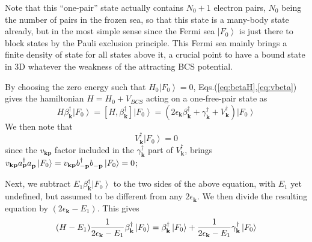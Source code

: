 \documentclass[epj]{svjour}
\newcommand{\vk}{\ensuremath{\mathbf{k}}}
\begin{document}
 Note that this ``one-pair'' state actually contains $N_0+1$ electron pairs, 
$N_0$ being the number of pairs in the frozen sea, so that this state is a many-body state already, but in the most simple sense since the Fermi sea $%
\left|F_0\right> $ is just there to block states by the Pauli exclusion
principle. This Fermi sea mainly brings a finite density of state for all
states above it, a crucial point to have a bound state in 3D whatever the weakness of the attracting BCS potential.

By choosing the zero energy such
that $H_0\left|F_0\right> =0$, Eqs.(\ref{eq:betaH},\ref{eq:vbeta}) gives the hamiltonian $H=H_0+V_{BCS}$
acting on a one-free-pair state as 
\begin{equation}
H\beta^{\dagger}_\vk\left|F_0\right>  =\left[H,\beta^{\dagger}_\vk\right] 
\left|F_0\right> 
=\left(2\epsilon_\vk\beta^{\dagger}_\vk+\gamma^{\dagger}_\vk+V^{\dagger}_\vk%
\right) \left|F_0\right>  
\end{equation}
We then note that 
\begin{equation}\label{eq:Vk0}
V^{\dagger}_\vk\left|F_0\right> =0
\end{equation}
since the $v_{\mathbf{k} \mathbf{p} }$ factor included
in the $\gamma^{\dagger}_{\mathbf{k} }$ part of $V^{\dagger}_\vk$,  brings
 $v_{\mathbf{k} \mathbf{p} }a^{\dagger}_{\mathbf{p} }a^{}_{%
\mathbf{p} }\left|F_0\right>=v_{\mathbf{k} \mathbf{p} }b^{\dagger}_{-\mathbf{p} }b^{}_{-\mathbf{p} }\left|F_0\right>=0$;
 
Next, we subtract $E _1\beta^{\dagger}_\vk\left|F_0\right>  $ to
the two sides of the above equation, with $E_1$ yet undefined, but assumed to be different from any $2\epsilon_{\mathbf{k}}$.  We then divide the resulting equation by $%
\left(2\epsilon_\vk-E _1\right) $.  This gives
\begin{equation}  \label{eq:HE1}
 (H-E_1)\frac{1}{2\epsilon_\vk-E _1} \beta^{\dagger}_\vk%
\left|F_0\right>  =\beta^{\dagger}_\vk\left|F_0\right>  +\frac{1}{%
2\epsilon_\vk-E _1} \gamma^{\dagger}_\vk\left|F_0\right>  
\end{equation}
\end{document}
